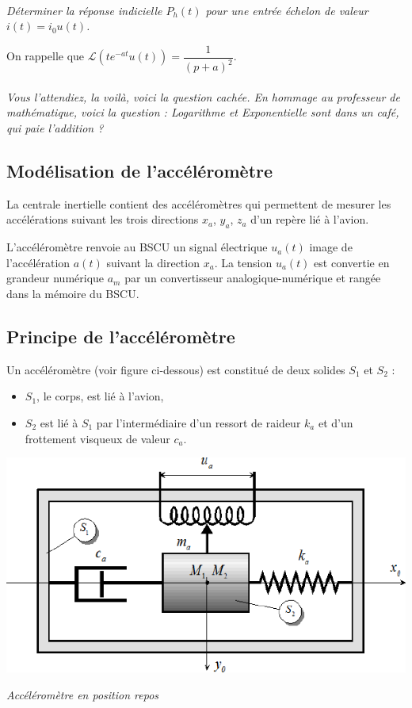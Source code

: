 \documentclass[10pt,oneside]{article}
\begin{document}
\paragraph{}
\textit{Déterminer la réponse indicielle $P_h(t)$ pour une entrée échelon de valeur $i(t)=i_0 u(t)$.}

On rappelle que $\mathcal{L}\left(te^{-at}u(t)\right)=\dfrac{1}{\left(p+a\right)^2}$.

\paragraph{}
\textit{Vous l'attendiez, la voilà, voici la question cachée. En hommage au professeur de mathématique, voici la question : 
Logarithme et Exponentielle sont dans un café, qui paie l'addition ?}
\subsection{Modélisation de l'accéléromètre}
La centrale inertielle contient des accéléromètres qui permettent de mesurer les accélérations suivant les
trois directions $x_a$, $y_a$, $z_a$ d’un repère lié à l’avion.

L’accéléromètre renvoie au BSCU un signal électrique $u_a(t)$ image de l’accélération $a(t)$ suivant la
direction $x_a$. La tension $u_a(t)$ est convertie en grandeur numérique $a_m$ par un convertisseur analogique-numérique
et rangée dans la mémoire du BSCU.

\subsection*{Principe de l’accéléromètre}
Un accéléromètre (voir figure ci-dessous) est constitué de deux solides
$S_1$ et $S_2$ :
\begin{itemize}
\item $S_1$, le corps, est lié à l’avion,
\item $S_2$ est lié à $S_1$ par l’intermédiaire d’un ressort de raideur $k_a$ et d’un frottement visqueux de valeur $c_a$.
\end{itemize}

\begin{center}
\includegraphics[width=.5\textwidth]{png/image12.png}

\textit{Accéléromètre en position repos}
\end{center}
\end{document}
